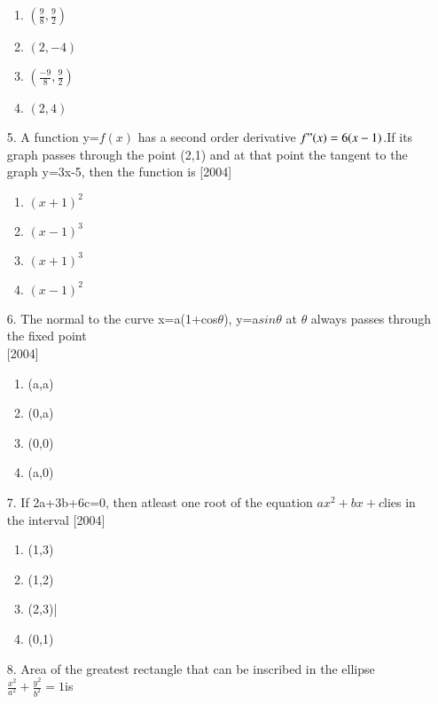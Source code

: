 \documentclass[journal,12pt,twocolumn]{IEEEtran}
\theoremstyle{remark}
\begin{document}
\begin{enumerate}
								\begin{enumerate}
								    \item $(\frac{9}{8},\frac{9}{2})$
								        \item $(2,-4)$
									    \item $(\frac{-9}{8},\frac{9}{2})$
									        \item $(2,4)$
										\end{enumerate}
										\item[5.]A function y=$f(x)$ has a second order derivative $f"(x)=6(x-1)$.If its graph passes through the point (2,1) and at that point the tangent to the graph y=3x-5, then the function is \hfill{[2004]}
										\begin{enumerate}
										    \item $(x+1)^2$
										        \item $(x-1)^3$
											    \item $(x+1)^3$
											        \item $(x-1)^2$
												\end{enumerate}
												\item[6.]The normal to the curve x=a(1+cos$\theta$), y=a$sin\theta$ at $\theta$ always passes through the fixed point\\ \hfill{[2004]}
												\begin{enumerate}
												    \item (a,a)
												        \item (0,a)
													    \item (0,0)
													        \item (a,0)
														\end{enumerate}
														\item[7.]If 2a+3b+6c=0, then atleast one root of the equation $ax^2+bx+c$lies in the interval \hfill{[2004]}
														\begin{enumerate}
														    \item (1,3)
														        \item (1,2)
															    \item (2,3)|
															        \item (0,1)
																\end{enumerate}  
																 \item[8.]Area of the greatest rectangle that can be inscribed in the ellipse $\frac{x^2}{a^2}+\frac{y^2}{b^2}=1$is
																 \begin{enumerate}

\end{enumerate}
\end{enumerate}
\end{document}
